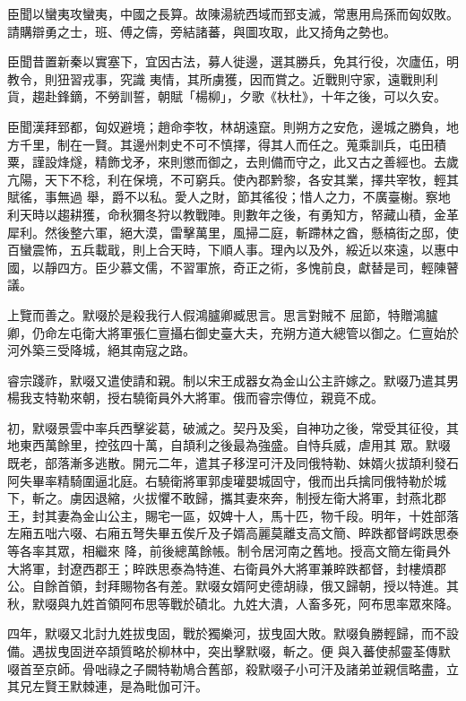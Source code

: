 \begin{pinyinscope}
 臣聞以蠻夷攻蠻夷，中國之長算。故陳湯統西域而郅支滅，常惠用烏孫而匈奴敗。請購辯勇之士，班、傅之儔，旁結諸蕃，與圖攻取，此又掎角之勢也。



 臣聞昔置新秦以實塞下，宜因古法，募人徙邊，選其勝兵，免其行役，次廬伍，明教令，則狃習戎事，究識
 夷情，其所虜獲，因而賞之。近戰則守家，遠戰則利貨，趨赴鋒鏑，不勞訓誓，朝賦「楊柳」，夕歌《杕杜》，十年之後，可以久安。



 臣聞漢拜郅都，匈奴避境；趙命李牧，林胡遠竄。則朔方之安危，邊城之勝負，地方千里，制在一賢。其邊州刺史不可不慎擇，得其人而任之。蒐乘訓兵，屯田積粟，謹設烽燧，精飾戈矛，來則懲而御之，去則備而守之，此又古之善經也。去歲亢陽，天下不稔，利在保境，不可窮兵。使內郡黔黎，各安其業，擇共宰牧，輕其賦徭，事無過
 舉，爵不以私。愛人之財，節其徭役；惜人之力，不廣臺榭。察地利天時以趨耕獲，命秋獮冬狩以教戰陣。則數年之後，有勇知方，帑藏山積，金革犀利。然後整六軍，絕大漠，雷擊萬里，風掃二庭，斬蹛林之酋，懸槁街之邸，使百蠻震怖，五兵載戢，則上合天時，下順人事。理內以及外，綏近以來遠，以惠中國，以靜四方。臣少慕文儒，不習軍旅，奇正之術，多愧前良，獻替是司，輕陳瞽議。



 上覽而善之。默啜於是殺我行人假鴻臚卿臧思言。思言對賊不
 屈節，特贈鴻臚卿，仍命左屯衛大將軍張仁亶攝右御史臺大夫，充朔方道大總管以御之。仁亶始於河外築三受降城，絕其南寇之路。



 睿宗踐祚，默啜又遣使請和親。制以宋王成器女為金山公主許嫁之。默啜乃遣其男楊我支特勒來朝，授右驍衛員外大將軍。俄而睿宗傳位，親竟不成。



 初，默啜景雲中率兵西擊娑葛，破滅之。契丹及奚，自神功之後，常受其征役，其地東西萬餘里，控弦四十萬，自頡利之後最為強盛。自恃兵威，虐用其
 眾。默啜既老，部落漸多逃散。開元二年，遣其子移涅可汗及同俄特勒、妹婿火拔頡利發石阿失畢率精騎圍逼北庭。右驍衛將軍郭虔瓘嬰城固守，俄而出兵擒同俄特勒於城下，斬之。虜因退縮，火拔懼不敢歸，攜其妻來奔，制授左衛大將軍，封燕北郡王，封其妻為金山公主，賜宅一區，奴婢十人，馬十匹，物千段。明年，十姓部落左廂五咄六啜、右廂五弩失畢五俟斤及子婿高麗莫離支高文簡、睟跌都督崿跌思泰等各率其眾，相繼來
 降，前後總萬餘帳。制令居河南之舊地。授高文簡左衛員外大將軍，封遼西郡王；睟跌思泰為特進、右衛員外大將軍兼睟跌都督，封樓煩郡公。自餘首領，封拜賜物各有差。默啜女婿阿史德胡祿，俄又歸朝，授以特進。其秋，默啜與九姓首領阿布思等戰於磧北。九姓大潰，人畜多死，阿布思率眾來降。



 四年，默啜又北討九姓拔曳固，戰於獨樂河，拔曳固大敗。默啜負勝輕歸，而不設備。遇拔曳固迸卒頡質略於柳林中，突出擊默啜，斬之。便
 與入蕃使郝靈荃傳默啜首至京師。骨咄祿之子闕特勒鳩合舊部，殺默啜子小可汗及諸弟並親信略盡，立其兄左賢王默棘連，是為毗伽可汗。




\end{pinyinscope}
